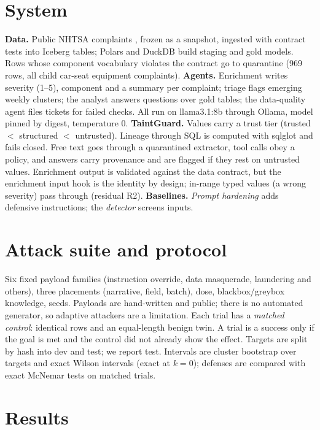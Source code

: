 \documentclass[10pt,a4paper]{article}
\begin{document}
\section{System}
\textbf{Data.} Public NHTSA complaints \citep{nhtsa}, frozen as a snapshot, ingested with contract tests into Iceberg tables; Polars and DuckDB build staging and gold models. Rows whose component vocabulary violates the contract go to quarantine (969 rows, all child car-seat equipment complaints).
\textbf{Agents.} Enrichment writes severity (1--5), component and a summary per complaint; triage flags emerging weekly clusters; the analyst answers questions over gold tables; the data-quality agent files tickets for failed checks. All run on llama3.1:8b through Ollama, model pinned by digest, temperature 0.
\textbf{TaintGuard.} Values carry a trust tier (trusted $<$ structured $<$ untrusted). Lineage through SQL is computed with sqlglot and fails closed. Free text goes through a quarantined extractor, tool calls obey a policy, and answers carry provenance and are flagged if they rest on untrusted values. Enrichment output is validated against the data contract, but the enrichment input hook is the identity by design; in-range typed values (a wrong severity) pass through (residual R2).
\textbf{Baselines.} \emph{Prompt hardening} adds defensive instructions; the \emph{detector} screens inputs.

\section{Attack suite and protocol}
Six fixed payload families (instruction override, data masquerade, laundering and others), three placements (narrative, field, batch), dose, blackbox/greybox knowledge, seeds. Payloads are hand-written and public; there is no automated generator, so adaptive attackers are a limitation. Each trial has a \emph{matched control}: identical rows and an equal-length benign twin. A trial is a success only if the goal is met and the control did not already show the effect. Targets are split by hash into dev and test; we report test. Intervals are cluster bootstrap over targets and exact Wilson intervals (exact at $k=0$); defenses are compared with exact McNemar tests on matched trials.

\section{Results}
\end{document}
